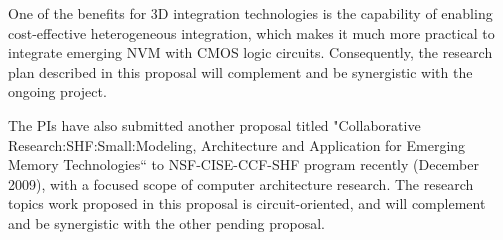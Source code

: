 One of the benefits for 3D integration technologies is
the capability of enabling cost-effective heterogeneous integration, which
makes it much more practical to integrate emerging NVM with CMOS logic circuits.
Consequently, the research plan described in this proposal will
complement and be synergistic with the ongoing project.

The PIs have also submitted another proposal titled "Collaborative Research:SHF:Small:Modeling, Architecture and Application for Emerging Memory Technologies`` to NSF-CISE-CCF-SHF program recently (December 2009), with a focused
scope of computer architecture research. The research topics work proposed in this proposal is circuit-oriented, and will complement and be synergistic with the other
pending proposal.

